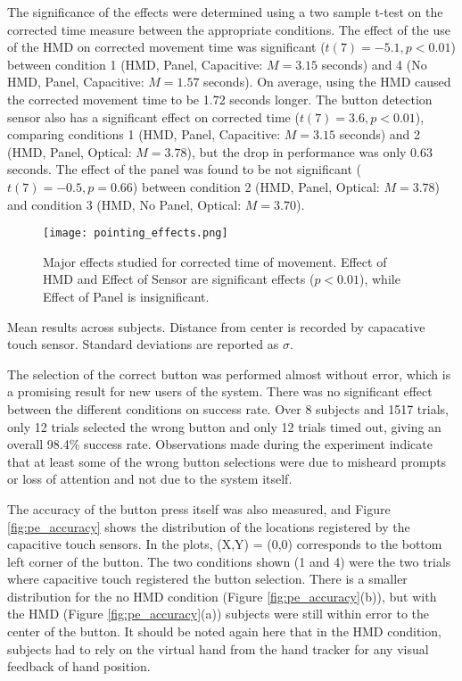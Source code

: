 The significance of the effects were determined using a two sample t-test on the corrected time measure between the appropriate conditions.
The effect of the use of the HMD on corrected movement time was significant ($t(7)=-5.1, p < 0.01$) between condition 1 (HMD, Panel, Capacitive: $M=3.15$ seconds) and 4 (No HMD, Panel, Capacitive: $M=1.57$ seconds).
On average, using the HMD caused the corrected movement time to be 1.72 seconds longer.
The button detection sensor also has a significant effect on corrected time ($t(7)=3.6, p < 0.01$), comparing conditions 1 (HMD, Panel, Capacitive: $M=3.15$ seconds) and 2 (HMD, Panel, Optical: $M=3.78$), but the drop in performance was only 0.63 seconds.
The effect of the panel was found to be not significant ($t(7)=-0.5, p=0.66$) between condition 2 (HMD, Panel, Optical: $M=3.78$) and condition 3 (HMD, No Panel, Optical: $M=3.70$).

\begin{figure}
    \centering
    \texttt{[image: pointing\_effects.png]}
    \caption{Major effects studied for corrected time of movement. Effect of HMD and Effect of Sensor are significant effects ($p<0.01$), while Effect of Panel is insignificant.}
    \label{fig:pe_effects}
\end{figure}

\begin{table}
    \centering
    \caption{Mean results across subjects. Distance from center is recorded by capacative touch sensor. Standard deviations are reported as $\sigma$.}
    \label{tab:pe_results}
\end{table}

The selection of the correct button was performed almost without error, which is a promising result for new users of the system.
There was no significant effect between the different conditions on success rate.
Over 8 subjects and 1517 trials, only 12 trials selected the wrong button and only 12 trials timed out, giving an overall 98.4\% success rate.
Observations made during the experiment indicate that at least some of the wrong button selections were due to misheard prompts or loss of attention and not due to the system itself.

The accuracy of the button press itself was also measured, and Figure \ref{fig:pe_accuracy} shows the distribution of the locations registered by the capacitive touch sensors.
In the plots, (X,Y) = (0,0) corresponds to the bottom left corner of the button.
The two conditions shown (1 and 4) were the two trials where capacitive touch registered the button selection.
There is a smaller distribution for the no HMD condition (Figure \ref{fig:pe_accuracy}(b)), but with the HMD (Figure \ref{fig:pe_accuracy}(a)) subjects were still within error to the center of the button.
It should be noted again here that in the HMD condition, subjects had to rely on the virtual hand from the hand tracker for any visual feedback of hand position.


